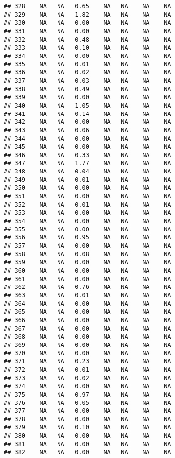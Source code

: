 \documentclass{article}\usepackage{graphicx, color}
\makeatletter
\newenvironment{kframe}{%
 \def\at@end@of@kframe{}%
 \ifinner\ifhmode%
  \def\at@end@of@kframe{\end{minipage}}%
  \begin{minipage}{\columnwidth}%
 \fi\fi%
 \def\FrameCommand##1{\hskip\@totalleftmargin \hskip-\fboxsep
 \colorbox{shadecolor}{##1}\hskip-\fboxsep
     \hskip-\linewidth \hskip-\@totalleftmargin \hskip\columnwidth}%
 \MakeFramed {\advance\hsize-\width
   \@totalleftmargin\z@ \linewidth\hsize
   \@setminipage}}%
 {\par\unskip\endMakeFramed%
 \at@end@of@kframe}
\newenvironment{knitrout}{}{} %
\makeatother
\begin{document}
\begin{knitrout}
\begin{kframe}
\begin{verbatim}
## 328    NA   NA   0.65    NA   NA    NA    NA
## 329    NA   NA   1.82    NA   NA    NA    NA
## 330    NA   NA   0.00    NA   NA    NA    NA
## 331    NA   NA   0.00    NA   NA    NA    NA
## 332    NA   NA   0.48    NA   NA    NA    NA
## 333    NA   NA   0.10    NA   NA    NA    NA
## 334    NA   NA   0.00    NA   NA    NA    NA
## 335    NA   NA   0.01    NA   NA    NA    NA
## 336    NA   NA   0.02    NA   NA    NA    NA
## 337    NA   NA   0.03    NA   NA    NA    NA
## 338    NA   NA   0.49    NA   NA    NA    NA
## 339    NA   NA   0.00    NA   NA    NA    NA
## 340    NA   NA   1.05    NA   NA    NA    NA
## 341    NA   NA   0.14    NA   NA    NA    NA
## 342    NA   NA   0.00    NA   NA    NA    NA
## 343    NA   NA   0.06    NA   NA    NA    NA
## 344    NA   NA   0.00    NA   NA    NA    NA
## 345    NA   NA   0.00    NA   NA    NA    NA
## 346    NA   NA   0.33    NA   NA    NA    NA
## 347    NA   NA   1.77    NA   NA    NA    NA
## 348    NA   NA   0.04    NA   NA    NA    NA
## 349    NA   NA   0.01    NA   NA    NA    NA
## 350    NA   NA   0.00    NA   NA    NA    NA
## 351    NA   NA   0.00    NA   NA    NA    NA
## 352    NA   NA   0.01    NA   NA    NA    NA
## 353    NA   NA   0.00    NA   NA    NA    NA
## 354    NA   NA   0.00    NA   NA    NA    NA
## 355    NA   NA   0.00    NA   NA    NA    NA
## 356    NA   NA   0.95    NA   NA    NA    NA
## 357    NA   NA   0.00    NA   NA    NA    NA
## 358    NA   NA   0.08    NA   NA    NA    NA
## 359    NA   NA   0.00    NA   NA    NA    NA
## 360    NA   NA   0.00    NA   NA    NA    NA
## 361    NA   NA   0.00    NA   NA    NA    NA
## 362    NA   NA   0.76    NA   NA    NA    NA
## 363    NA   NA   0.01    NA   NA    NA    NA
## 364    NA   NA   0.00    NA   NA    NA    NA
## 365    NA   NA   0.00    NA   NA    NA    NA
## 366    NA   NA   0.00    NA   NA    NA    NA
## 367    NA   NA   0.00    NA   NA    NA    NA
## 368    NA   NA   0.00    NA   NA    NA    NA
## 369    NA   NA   0.00    NA   NA    NA    NA
## 370    NA   NA   0.00    NA   NA    NA    NA
## 371    NA   NA   0.23    NA   NA    NA    NA
## 372    NA   NA   0.01    NA   NA    NA    NA
## 373    NA   NA   0.02    NA   NA    NA    NA
## 374    NA   NA   0.00    NA   NA    NA    NA
## 375    NA   NA   0.97    NA   NA    NA    NA
## 376    NA   NA   0.05    NA   NA    NA    NA
## 377    NA   NA   0.00    NA   NA    NA    NA
## 378    NA   NA   0.00    NA   NA    NA    NA
## 379    NA   NA   0.10    NA   NA    NA    NA
## 380    NA   NA   0.00    NA   NA    NA    NA
## 381    NA   NA   0.00    NA   NA    NA    NA
## 382    NA   NA   0.00    NA   NA    NA    NA

\end{verbatim}
\end{kframe}
\end{knitrout}
\end{document}
